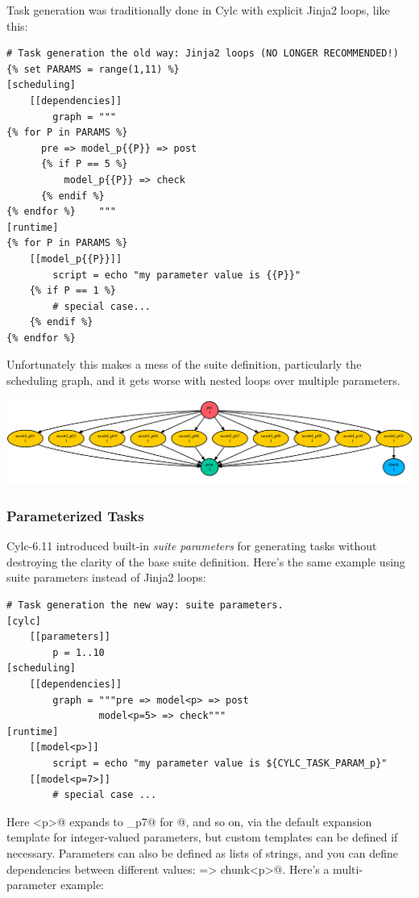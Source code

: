 Task generation was traditionally done in Cylc with explicit Jinja2 loops,
like this:
\lstset{language=suiterc}
\begin{lstlisting}
# Task generation the old way: Jinja2 loops (NO LONGER RECOMMENDED!)
{% set PARAMS = range(1,11) %}
[scheduling]
    [[dependencies]]
        graph = """
{% for P in PARAMS %}
      pre => model_p{{P}} => post
      {% if P == 5 %}
          model_p{{P}} => check
      {% endif %}
{% endfor %}    """
[runtime]
{% for P in PARAMS %}
    [[model_p{{P}}]]
        script = echo "my parameter value is {{P}}"
    {% if P == 1 %}
        # special case...
    {% endif %}
{% endfor %}
\end{lstlisting}

Unfortunately this makes a mess of the suite definition, particularly the
scheduling graph, and it gets worse with nested loops over multiple parameters.

\includegraphics[width=\textwidth]{resources/png/param-1.png}

\subsubsection{Parameterized Tasks}
\label{Parameterized Tasks}

Cylc-6.11 introduced built-in {\em suite parameters} for generating tasks
without destroying the clarity of the base suite definition. Here's the same
example using suite parameters instead of Jinja2 loops:

\lstset{language=suiterc}
\begin{lstlisting}
# Task generation the new way: suite parameters.
[cylc]
    [[parameters]]
        p = 1..10
[scheduling]
    [[dependencies]]
        graph = """pre => model<p> => post
                model<p=5> => check"""
[runtime]
    [[model<p>]]
        script = echo "my parameter value is ${CYLC_TASK_PARAM_p}"
    [[model<p=7>]]
        # special case ...
\end{lstlisting}

Here \lstinline@model<p>@ expands to \lstinline@model_p7@ for @,
and so on, via the default expansion template for integer-valued parameters,
but custom templates can be defined if necessary. Parameters can also be
defined as lists of strings, and you can define dependencies between different
values:  => chunk<p>@.  Here's a multi-parameter example:

